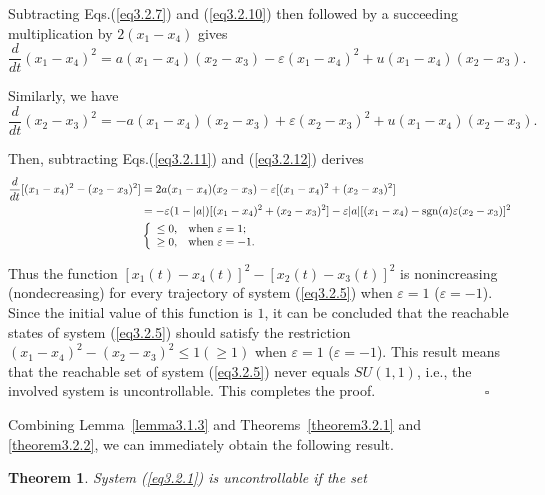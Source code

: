 \documentclass[onecolumn,showpacs,showkeys,preprintnumbers]{revtex4}
\newtheorem{theorem}{Theorem}[section]
\begin{document}
\noindent Subtracting Eqs.(\ref{eq3.2.7}) and (\ref{eq3.2.10})
then followed by a succeeding multiplication by $2(x_1-x_4)$ gives\noindent\begin{equation}\label{eq3.2.11}
  \frac{d}{dt}(x_1-x_4)^2=a(x_1-x_4)(x_2-x_3)-{\varepsilon}(x_1-x_4)^2+u(x_1-x_4)(x_2-x_3).
\end{equation}

\noindent Similarly, we have\noindent\begin{equation}\label{eq3.2.12}
  \frac{d}{dt}(x_2-x_3)^2={-a}(x_1-x_4)(x_2-x_3)+{\varepsilon}(x_2-x_3)^2+u(x_1-x_4)(x_2-x_3).
\end{equation}

\noindent Then, subtracting Eqs.(\ref{eq3.2.11}) and
(\ref{eq3.2.12}) derives\noindent\begin{equation}\label{eq3.2.13}
\begin{split}
  \frac{d}{dt}[(x_1-x_4)^2-(x_2-x_3)^2]&=2a(x_1-x_4)(x_2-x_3)-{\varepsilon}[(x_1-x_4)^2+(x_2-x_3)^2] \\
  &=-{\varepsilon}(1-|a|)[(x_1-x_4)^2+(x_2-x_3)^2]-{\varepsilon}|a|[(x_1-x_4)-\text{sgn}(a){\varepsilon}(x_2-x_3)]^2\\
  &\left\{    \begin{array}{ll}
        \leq0, & \hbox{when $\varepsilon=1$;} \\
       \geq0, & \hbox{when $\varepsilon=-1$.} \\
    \end{array}\right.
\end{split}
\end{equation}

\noindent Thus the function $[x_1(t)-x_4(t)]^2-[x_2(t)-x_3(t)]^2$
is nonincreasing (nondecreasing) for every trajectory of system
(\ref{eq3.2.5}) when $\varepsilon=1$ ($\varepsilon=-1$). Since the
initial value of this function is $1$, it can be concluded that
the reachable states of system (\ref{eq3.2.5}) should satisfy the
restriction $(x_1-x_4)^2-(x_2-x_3)^2\leq1 (\geq1)$ when
$\varepsilon=1$ ($\varepsilon=-1$). This result means that the
reachable set of system (\ref{eq3.2.5}) never equals $SU(1,1)$,
i.e., the involved system is uncontrollable. This completes the
proof. ~~~~~~~~~~~~~~~$\square$

Combining Lemma~\ref{lemma3.1.3} and Theorems~\ref{theorem3.2.1}
and \ref{theorem3.2.2}, we can immediately obtain the following
result.

\noindent\begin{theorem}\label{theorem3.2.3}System (\ref{eq3.2.1}) is uncontrollable if the set
\end{theorem}
\end{document}
